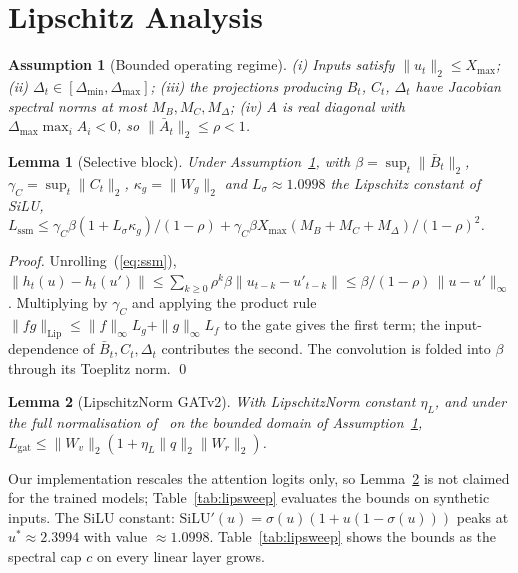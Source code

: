 \documentclass[conference,compsoc]{IEEEtran}
\newtheorem{lemma}{Lemma}
\newtheorem{assumption}{Assumption}
\begin{document}
\section{Lipschitz Analysis}
\label{app:lipschitz}
\begin{assumption}[Bounded operating regime]
\label{ass:bounded}
(i) Inputs satisfy $\|u_{t}\|_{2}\le X_{\max}$; (ii) $\Delta_{t}\in[\Delta_{\min},\Delta_{\max}]$; (iii) the projections producing $B_{t}$, $C_{t}$, $\Delta_{t}$ have Jacobian spectral norms at most $M_{B},M_{C},M_{\Delta}$; (iv) $A$ is real diagonal with $\Delta_{\max}\max_{i}A_{i}<0$, so $\|\bar A_{t}\|_{2}\le\rho<1$.
\end{assumption}
\begin{lemma}[Selective block]
\label{lem:lipssm}
Under Assumption~\ref{ass:bounded}, with $\beta=\sup_{t}\|\bar B_{t}\|_{2}$, $\gamma_{C}=\sup_{t}\|C_{t}\|_{2}$, $\kappa_{g}=\|W_{g}\|_{2}$ and $L_{\sigma}\approx1.0998$ the Lipschitz constant of SiLU, $L_{\text{ssm}}\le\gamma_{C}\beta(1+L_{\sigma}\kappa_{g})/(1-\rho)+\gamma_{C}\beta X_{\max}(M_{B}+M_{C}+M_{\Delta})/(1-\rho)^{2}$.
\end{lemma}
\emph{Proof.} Unrolling~(\ref{eq:ssm}), $\|h_{t}(u)-h_{t}(u')\|\le\sum_{k\ge0}\rho^{k}\beta\|u_{t-k}-u'_{t-k}\|\le\beta/(1-\rho)\,\|u-u'\|_{\infty}$. Multiplying by $\gamma_{C}$ and applying the product rule $\|fg\|_{\text{Lip}}\le\|f\|_{\infty}L_{g}+\|g\|_{\infty}L_{f}$ to the gate gives the first term; the input-dependence of $\bar B_{t},C_{t},\Delta_{t}$ contributes the second. The convolution is folded into $\beta$ through its Toeplitz norm. \qed

\begin{lemma}[LipschitzNorm GATv2]
\label{lem:lipgat}
With LipschitzNorm constant $\eta_{L}$, and under the full normalisation of~\cite{Dasoulas2021LipNorm} on the bounded domain of Assumption~\ref{ass:bounded}, $L_{\text{gat}}\le\|W_{v}\|_{2}(1+\eta_{L}\|q\|_{2}\|W_{r}\|_{2})$.
\end{lemma}
Our implementation rescales the attention logits only, so Lemma~\ref{lem:lipgat} is not claimed for the trained models; Table~\ref{tab:lipsweep} evaluates the bounds on synthetic inputs.
The SiLU constant: $\mathrm{SiLU}'(u)=\sigma(u)(1+u(1-\sigma(u)))$ peaks at $u^{*}\approx2.3994$ with value $\approx1.0998$. Table~\ref{tab:lipsweep} shows the bounds as the spectral cap $c$ on every linear layer grows.
\end{document}
